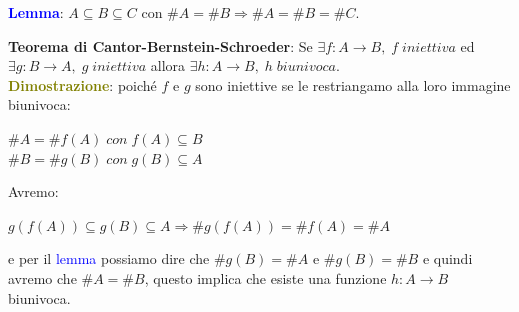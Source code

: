 \begin{boxA}
    \textcolor{blue}{\textbf{Lemma}}: $A \subseteq B \subseteq C$ con $\#A = \#B \Rightarrow \#A = \#B = \#C$.
\end{boxA}

\newpage
\textbf{Teorema di Cantor-Bernstein-Schroeder}: Se $\exists f : A \rightarrow B, \; f \; iniettiva$ ed $\exists g : B \rightarrow A, \; g \; iniettiva$ allora $\exists h : A \rightarrow B, \; h \; biunivoca$. \\
\textcolor{olive}{\textbf{Dimostrazione}}: poiché $f$ e $g$ sono iniettive se le restriangamo alla loro immagine biunivoca:
\begin{center}
    $\#A = \#f(A) \; con \; f(A) \subseteq B$ \\
    $\#B = \#g(B) \; con \; g(B) \subseteq A$ \\
\end{center}
Avremo:
\begin{center}
    $g(f(A)) \subseteq g(B) \subseteq A \Rightarrow \#g(f(A)) = \#f(A) = \#A$
\end{center}
e per il \textcolor{blue}{lemma} possiamo dire che $\#g(B) = \#A$ e $\#g(B) = \#B$ e quindi avremo che $\#A = \#B$, questo implica che esiste una funzione $h : A \rightarrow B$ biunivoca.

